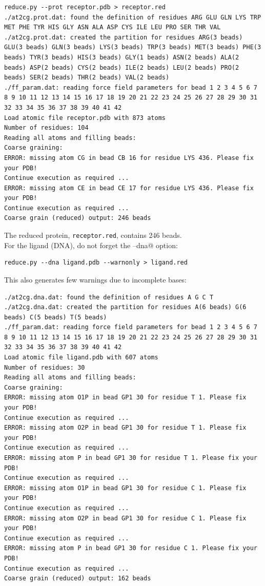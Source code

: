 \documentclass[12pt,a4paper]{article}
\begin{document}
\begin{verbatim}
reduce.py --prot receptor.pdb > receptor.red
./at2cg.prot.dat: found the definition of residues ARG GLU GLN LYS TRP MET PHE TYR HIS GLY ASN ALA ASP CYS ILE LEU PRO SER THR VAL 
./at2cg.prot.dat: created the partition for residues ARG(3 beads) GLU(3 beads) GLN(3 beads) LYS(3 beads) TRP(3 beads) MET(3 beads) PHE(3 beads) TYR(3 beads) HIS(3 beads) GLY(1 beads) ASN(2 beads) ALA(2 beads) ASP(2 beads) CYS(2 beads) ILE(2 beads) LEU(2 beads) PRO(2 beads) SER(2 beads) THR(2 beads) VAL(2 beads) 
./ff_param.dat: reading force field parameters for bead 1 2 3 4 5 6 7 8 9 10 11 12 13 14 15 16 17 18 19 20 21 22 23 24 25 26 27 28 29 30 31 32 33 34 35 36 37 38 39 40 41 42 
Load atomic file receptor.pdb with 873 atoms 
Number of residues: 104
Reading all atoms and filling beads:
Coarse graining:
ERROR: missing atom CG in bead CB 16 for residue LYS 436. Please fix your PDB!
Continue execution as required ...
ERROR: missing atom CE in bead CE 17 for residue LYS 436. Please fix your PDB!
Continue execution as required ...
Coarse grain (reduced) output: 246 beads 
\end{verbatim}

The reduced protein, {\tt receptor.red}, contains 246 beads.\\

For the ligand (DNA), do not forget the \verb@--dna@ option:
\begin{verbatim}
reduce.py --dna ligand.pdb --warnonly > ligand.red
\end{verbatim}
This also generates few warnings due to incomplete bases:
\begin{verbatim}
./at2cg.dna.dat: found the definition of residues A G C T 
./at2cg.dna.dat: created the partition for residues A(6 beads) G(6 beads) C(5 beads) T(5 beads) 
./ff_param.dat: reading force field parameters for bead 1 2 3 4 5 6 7 8 9 10 11 12 13 14 15 16 17 18 19 20 21 22 23 24 25 26 27 28 29 30 31 32 33 34 35 36 37 38 39 40 41 42 
Load atomic file ligand.pdb with 607 atoms 
Number of residues: 30
Reading all atoms and filling beads:
Coarse graining:
ERROR: missing atom O1P in bead GP1 30 for residue T 1. Please fix your PDB!
Continue execution as required ...
ERROR: missing atom O2P in bead GP1 30 for residue T 1. Please fix your PDB!
Continue execution as required ...
ERROR: missing atom P in bead GP1 30 for residue T 1. Please fix your PDB!
Continue execution as required ...
ERROR: missing atom O1P in bead GP1 30 for residue C 1. Please fix your PDB!
Continue execution as required ...
ERROR: missing atom O2P in bead GP1 30 for residue C 1. Please fix your PDB!
Continue execution as required ...
ERROR: missing atom P in bead GP1 30 for residue C 1. Please fix your PDB!
Continue execution as required ...
Coarse grain (reduced) output: 162 beads
\end{verbatim}
\end{document}
